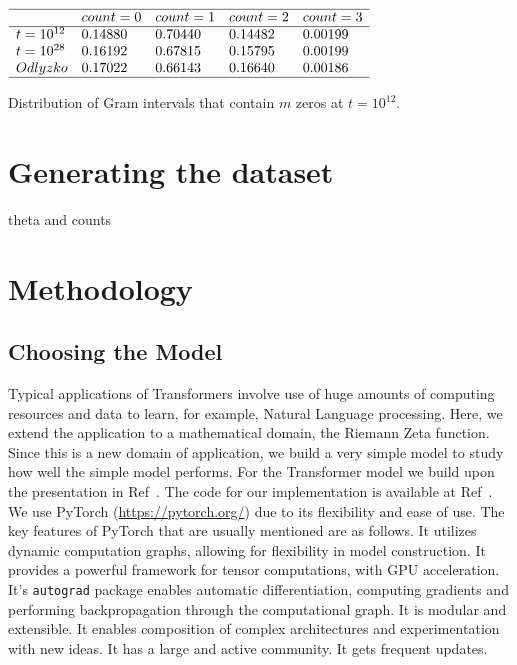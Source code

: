 \documentclass[journal]{IEEEtai}
\begin{document}
\begin{table}
\centering \(\begin{array}{lllll}\\
\hline
 &count = 0&count = 1&count = 2&count = 3\\
\hline
t = 10^{12}&0.14880&0.70440&0.14482&0.00199\\
t = 10^{28}&0.16192&0.67815&0.15795&0.00199\\
Odlyzko&0.17022&0.66143&0.16640&0.00186\\
\hline
\end{array}\)
\caption{Distribution of Gram intervals that contain $m$ zeros at  $t=10^{12}$.} 
\label{tab:intervalzeros}
\end{table}


\section{Generating the dataset}

theta and counts


\section{Methodology}


\subsection{\label{sec3.1} Choosing the Model}
Typical applications of Transformers involve use of huge amounts of computing resources and data to learn, for example, Natural Language processing. Here, we extend the application to a mathematical domain, the Riemann Zeta function. Since this is a new domain of application, we build a very simple model to study how well the simple model performs. For the Transformer model we build upon the presentation in  Ref~\cite{BenjaminEtienne}. The code for our implementation is available at 
 Ref~\cite{shankergit}.
We use PyTorch (\url{https://pytorch.org/})  due to its flexibility and ease of use.
The key features of PyTorch that are usually mentioned are as follows.  It utilizes dynamic computation graphs, allowing for  flexibility in model construction. It provides a powerful framework for tensor computations,  with GPU acceleration. It's \texttt{autograd} package enables automatic differentiation, computing gradients and performing backpropagation through the computational graph.  It is modular and extensible. It enables   composition of complex architectures and experimentation with new ideas. It has a large and active community. It gets frequent updates.
\end{document}
